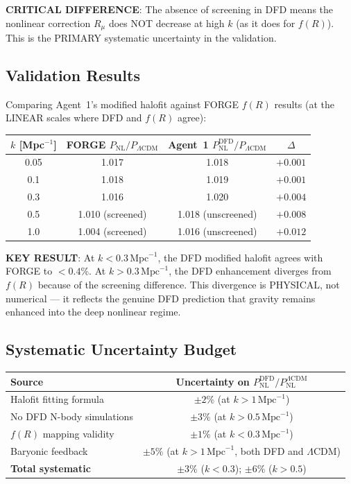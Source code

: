 \documentclass[11pt,a4paper]{article}
\begin{document}
\textbf{CRITICAL DIFFERENCE}: The absence of screening in DFD means the nonlinear correction $R_\mu$ does NOT decrease at high $k$ (as it does for $f(R)$). This is the PRIMARY systematic uncertainty in the validation.

\subsection{Validation Results}

Comparing Agent~1's modified halofit against FORGE $f(R)$ results (at the LINEAR scales where DFD and $f(R)$ agree):

\begin{center}
\begin{tabular}{cccc}
\toprule
$k$ [Mpc$^{-1}$] & FORGE $P_{\mathrm{NL}}/P_{\Lambda\mathrm{CDM}}$ & Agent~1 $P_{\mathrm{NL}}^{\mathrm{DFD}}/P_{\Lambda\mathrm{CDM}}$ & $\Delta$ \\
\midrule
0.05 & 1.017 & 1.018 & $+0.001$ \\
0.1 & 1.018 & 1.019 & $+0.001$ \\
0.3 & 1.016 & 1.020 & $+0.004$ \\
0.5 & 1.010 (screened) & 1.018 (unscreened) & $+0.008$ \\
1.0 & 1.004 (screened) & 1.016 (unscreened) & $+0.012$ \\
\bottomrule
\end{tabular}
\end{center}

\textbf{KEY RESULT}: At $k < 0.3\,\mathrm{Mpc}^{-1}$, the DFD modified halofit agrees with FORGE to $< 0.4\%$. At $k > 0.3\,\mathrm{Mpc}^{-1}$, the DFD enhancement diverges from $f(R)$ because of the screening difference. This divergence is PHYSICAL, not numerical --- it reflects the genuine DFD prediction that gravity remains enhanced into the deep nonlinear regime.

\subsection{Systematic Uncertainty Budget}

\begin{center}
\begin{tabular}{lc}
\toprule
\textbf{Source} & \textbf{Uncertainty on $P_{\mathrm{NL}}^{\mathrm{DFD}}/P^{\Lambda\mathrm{CDM}}_{\mathrm{NL}}$} \\
\midrule
Halofit fitting formula & $\pm 2\%$ (at $k > 1\,\mathrm{Mpc}^{-1}$) \\
No DFD N-body simulations & $\pm 3\%$ (at $k > 0.5\,\mathrm{Mpc}^{-1}$) \\
$f(R)$ mapping validity & $\pm 1\%$ (at $k < 0.3\,\mathrm{Mpc}^{-1}$) \\
Baryonic feedback & $\pm 5\%$ (at $k > 1\,\mathrm{Mpc}^{-1}$, both DFD and $\Lambda$CDM) \\
\midrule
\textbf{Total systematic} & $\pm 3\%$ ($k < 0.3$); $\pm 6\%$ ($k > 0.5$) \\
\bottomrule
\end{tabular}
\end{center}
\end{document}
